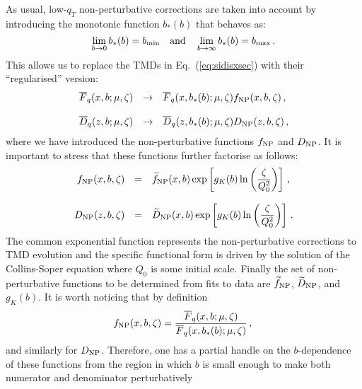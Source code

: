 \documentclass[10pt,a4paper]{article}
\begin{document}
As usual, low-$q_T$ non-perturbative corrections are taken into
account by introducing the monotonic function $b_*(b)$ that behaves
as:
\begin{equation}
  \lim_{b\rightarrow 0}
  b_*(b) = b_{\rm min}\quad\mbox{and}\quad\lim_{b\rightarrow \infty}
  b_*(b) = b_{\rm max}\,.
\end{equation}
This allows us to replace the TMDs in Eq.~(\ref{eq:sidisxsec}) with
their ``regularised'' version:
\begin{equation}
\begin{array}{rcl}
  \overline{F}_q(x,b;\mu,\zeta) &\rightarrow&
  \overline{F}_q(x,b_*(b);\mu,\zeta) f_{\rm NP}(x,b,\zeta)\,,\\
\\
  \overline{D}_q(z,b;\mu,\zeta) &\rightarrow&
  \overline{D}_q(z,b_*(b);\mu,\zeta) D_{\rm NP}(z,b,\zeta)\,,
\end{array}
\label{eq:fandDNP}
\end{equation}
where we have introduced the non-perturbative functions $f_{\rm NP}$
and $D_{\rm NP}$. It is important to stress that these functions
further factorise as follows:
\begin{equation}
\begin{array}{rcl}
f_{\rm NP}(x,b,\zeta)&=&\displaystyle\widetilde{f}_{\rm NP}(x,b)\exp\left[g_K(b)\ln\left(\frac{\zeta}{Q_0^2}\right)\right]\,,\\
\\
D_{\rm NP}(z,b,\zeta) &=&\displaystyle\widetilde{D}_{\rm NP}(x,b)\exp\left[g_K(b)\ln\left(\frac{\zeta}{Q_0^2}\right)\right]\,.
\end{array}
\label{NPfuncts}
\end{equation}
The common exponential function represents the non-perturbative
corrections to TMD evolution and the specific functional form is
driven by the solution of the Collins-Soper equation where $Q_0$ is
some initial scale. Finally the set of non-perturbative functions to
be determined from fits to data are $\widetilde{f}_{\rm NP}$,
$\widetilde{D}_{\rm NP}$, and $g_K(b)$. It is worth noticing that by definition
\begin{equation}
 f_{\rm NP}(x,b,\zeta) = \frac{\overline{F}_q(x,b;\mu,\zeta)}{\overline{F}_q(x,b_*(b);\mu,\zeta)} \,,\\
\end{equation}
and similarly for $D_{\rm NP}$. Therefore, one has a partial handle on
the $b$-dependence of these functions from the region in which $b$ is
small enough to make both numerator and denominator perturbatively
\end{document}
